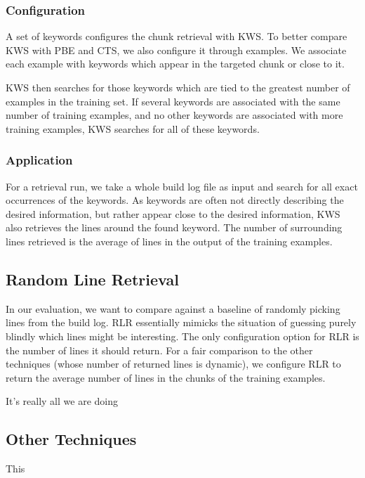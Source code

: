 \subsubsection{Configuration}
A set of keywords configures the chunk retrieval with KWS\@.
To better
compare KWS with PBE and CTS, we also configure it through examples.
We associate each example with keywords which appear in the targeted
chunk or close to it.

KWS then searches for those keywords which are tied to the greatest
number of examples in the training set.
If several keywords are associated with the same number of training
examples, and no other keywords are associated with more training
examples, KWS searches for all of these keywords.

\subsubsection{Application}
For a retrieval run, we take a whole build log file as input and
search for all exact occurrences of the keywords.
As keywords are
often not directly describing the desired information, but rather
appear close to the desired information, KWS also retrieves the lines
around the found keyword.
The number of surrounding lines retrieved is
the average of lines in the output of the training examples.


\subsection{Random Line Retrieval}
\label{sec:expl-rlr}
In our evaluation, we want to compare against a baseline of randomly
picking lines from the build log.
RLR essentially mimicks the
situation of guessing purely blindly which lines might be interesting.
The only configuration option for RLR is the number of lines it should
return.
For a fair comparison to the other techniques (whose number of
returned lines is dynamic), we configure RLR to return the average
number of lines in the chunks of the training examples.

It's really all we are doing

\subsection{Other Techniques}
This

